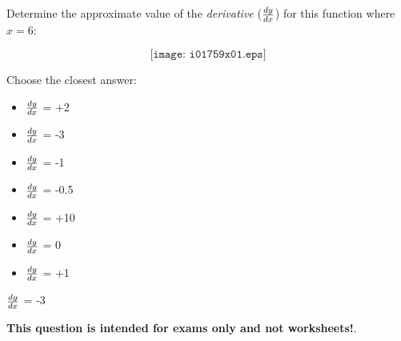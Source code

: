 

Determine the approximate value of the {\it derivative} ($dy \over dx$) for this function where $x=6$:

$$\texttt{[image: i01759x01.eps]}$$

Choose the closest answer:

\begin{itemize}
\item{} $dy \over dx$ = +2
\vskip 10pt 
\item{} $dy \over dx$ = -3
\vskip 10pt 
\item{} $dy \over dx$ = -1
\vskip 10pt 
\item{} $dy \over dx$ = -0.5
\vskip 10pt 
\item{} $dy \over dx$ = +10 
\vskip 10pt 
\item{} $dy \over dx$ = 0
\vskip 10pt 
\item{} $dy \over dx$ = +1
\end{itemize}







$dy \over dx$ = -3







{\bf This question is intended for exams only and not worksheets!}.



